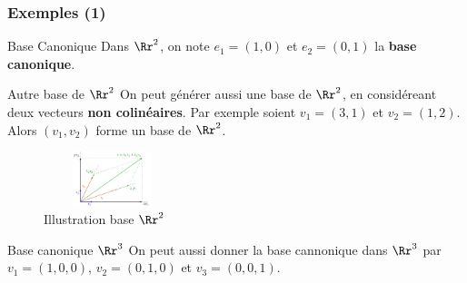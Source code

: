 \documentclass[dvipsnames]{beamer}
\begin{document}
\begin{frame}[t]
  \frametitle{Exemples (1)}
 \begin{block}{Base Canonique}
   \scriptsize
   Dans $\Rr^2$, on note $e_1 = (1, 0)$ et $e_2 = (0,1)$ la
   \textbf{\alert{base canonique}}.
 \end{block} 
 \pause
 \begin{block}{Autre base de $\Rr^2$}
  \scriptsize
  On peut générer aussi une base de $\Rr^2$, en considéreant deux vecteurs
  \textbf{non colinéaires}. Par exemple soient $v_1=(3,1)$ et $v_2=(1,2)$.
  Alors $(v_1,v_2)$ forme un base de $\Rr^2$.
 \end{block}
 \begin{figure}[htpb]
   \centering
   \includegraphics[width=4cm, height=1.6cm]{./simple_base_r2.png}
   \caption{Illustration base $\Rr^2$}%
 \end{figure}
 \begin{block}{Base canonique $\Rr^3$}
   \scriptsize
   On peut aussi donner la base cannonique dans $\Rr^3$ par $v_1=(1,0,0)$,
   $v_2 = (0,1,0)$ et $v_3 = (0,0,1)$.
   
 \end{block}
\end{frame}
\end{document}
